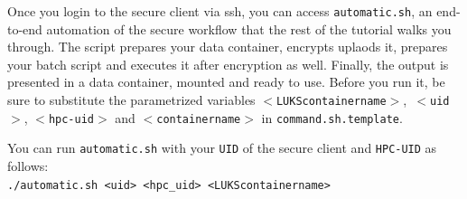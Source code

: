 \documentclass[paper=a4]{scrartcl}
\begin{document}
Once you login to the secure client via ssh, you can access \texttt{automatic.sh}, an end-to-end automation of the secure workflow that the rest of the tutorial walks you through. 
The script prepares your data container, encrypts uplaods it, prepares your batch script and executes it after encryption as well. Finally, the output is presented in a data container, mounted and ready to use. 
Before you run it, be sure to substitute the parametrized variables \texttt{$<$LUKScontainername$>$},\texttt{ $<$uid$>$}, \texttt{$<$hpc-uid$>$} and \texttt{$<$containername$>$} in \texttt{command.sh.template}. 

You can run \texttt{automatic.sh} with your \texttt{UID} of the secure client and \texttt{HPC-UID} as follows:\\
\texttt{./automatic.sh <uid> <hpc\_uid> <LUKScontainername>} \\
\end{document}
